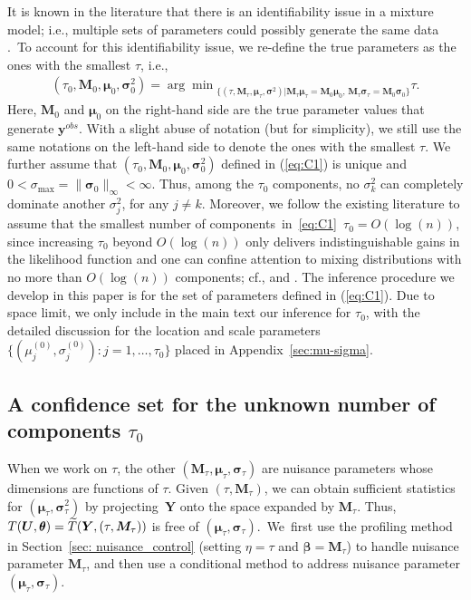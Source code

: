 \documentclass[12pt]{article}
\theoremstyle{shortspace}
\def\*#1{\bm{#1}}
\def\btheta{\mathop{\theta\kern-.45em\hbox{$\theta$}}\nolimits}
\begin{document}
 

It is known in the literature that there is an identifiability issue in a mixture model; i.e., multiple sets of parameters could possibly generate the same data \citep{LiuShao2003}.~To account for this  identifiability 
issue, 
we re-define the true parameters as 
the ones with the smallest $\tau$, i.e., 
\begin{align}
\label{eq:C1}
(\tau_0, \*M_0, {\*\mu}_0, \*\sigma_0^2) =  
{\arg \min}_{\{(\tau, \*M_{\tau}, {\*\mu}_{\tau}, \*\sigma^2)|  {\*M}_{\tau} {\*\mu}_{\tau} = {\*M}_{0} {\*\mu}_{0}, \,   {\*M}_{\tau} {\*\sigma}_{\tau} = {\*M}_{0} {\*\sigma}_{0}\} }  \tau.   
\end{align}
Here, $\*M_0$ and ${\bm \mu}_0$ on the right-hand side are the true parameter values that generate $\*y^{obs}.$ 
  With a slight abuse of notation (but for simplicity), we still use the same notations on the left-hand side to denote the ones 
with the smallest $\tau$. 
We further assume that $(\tau_0, \*M_0, {\*\mu}_0, \*\sigma_0^2)$ defined in (\ref{eq:C1})
is unique and 
 $0 <  \sigma_{\max} = \|\*\sigma_0\|_\infty < \infty.$
Thus, among the $\tau_0$ components, 
no $\sigma_k^2$
can completely dominate another $\sigma_{j}^2$, for any $j \not= k$. 
Moreover, we follow the existing  literature to assume that the smallest number of components~in~\eqref{eq:C1}~$\tau_0 = O(\log(n))$, since increasing $\tau_0$ beyond $O(\log(n))$ only delivers indistinguishable gains in the likelihood function and one can confine attention to mixing distributions with no more than $O(\log(n))$ components; cf., \cite{ghosal2001entropies} and \cite{wu2025nonparametric}.
The inference procedure we develop in this paper is for the set of parameters defined in (\ref{eq:C1}). Due to space limit, 
we only include in the main text our inference for $\tau_0$,
with the detailed discussion for the location and scale parameters $\{(\mu_j^{(0)},\sigma_j^{(0)}): j=1,\ldots,\tau_0\}$ placed in  Appendix~\ref{sec:mu-sigma}.





\subsection{A confidence set for the unknown number of components $\tau_0$}  \label{sec:components}

When we work on $\tau$,  the other $(\*M_\tau, \*\mu_\tau, \*\sigma_\tau)$ are nuisance parameters whose dimensions are functions of $\tau$.  Given $ (\tau, \*M_\tau)$, we can obtain sufficient statistics for $(\*\mu_\tau,\*\sigma^2_\tau)$ by projecting~$\*Y$ onto the space expanded by $\*M_\tau$. Thus, $T(\*U, \btheta)= \widetilde T(\*Y, (\tau,{\*M_\tau}))$ is free of $(\*\mu_\tau, \*\sigma_\tau)$.~We~first use the profiling method in Section~\ref{sec: nuisance_control} (setting $\eta=\tau$ and $\*\beta=\*M_\tau$) to handle nuisance parameter $\*M_\tau$, and then use a conditional method to address nuisance parameter $(\*\mu_\tau,\*\sigma_\tau)$. 
\end{document}

